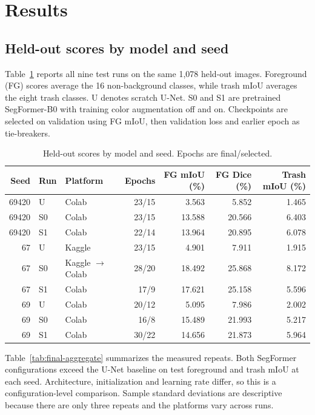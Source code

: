 \section{Results}
\subsection{Held-out scores by model and seed}
Table~\ref{tab:final-seed-results} reports all nine test runs on the same 1,078 held-out images. Foreground (FG) scores average the 16 non-background classes, while trash mIoU averages the eight trash classes. U denotes scratch U-Net. S0 and S1 are pretrained SegFormer-B0 with training color augmentation off and on. Checkpoints are selected on validation using FG mIoU, then validation loss and earlier epoch as tie-breakers.

\begin{table}[H]\centering\small
\caption{Held-out scores by model and seed. Epochs are final/selected.}\label{tab:final-seed-results}
\begin{tabular}{@{}rllrrrr@{}}\toprule
Seed & Run & Platform & Epochs & FG mIoU (\%) & FG Dice (\%) & Trash mIoU (\%) \\\midrule
69420 & U & Colab & 23/15 & 3.563 & 5.852 & 1.465 \\
69420 & S0 & Colab & 23/15 & 13.588 & 20.566 & 6.403 \\
69420 & S1 & Colab & 22/14 & 13.964 & 20.895 & 6.078 \\
67 & U & Kaggle & 23/15 & 4.901 & 7.911 & 1.915 \\
67 & S0 & Kaggle $\to$ Colab & 28/20 & 18.492 & 25.868 & 8.172 \\
67 & S1 & Colab & 17/9 & 17.621 & 25.158 & 5.596 \\
69 & U & Colab & 20/12 & 5.095 & 7.986 & 2.002 \\
69 & S0 & Colab & 16/8 & 15.489 & 21.993 & 5.217 \\
69 & S1 & Colab & 30/22 & 14.656 & 21.873 & 5.964 \\
\bottomrule
\end{tabular}
\end{table}

Table~\ref{tab:final-aggregate} summarizes the measured repeats. Both SegFormer configurations exceed the U-Net baseline on test foreground and trash mIoU at each seed. Architecture, initialization and learning rate differ, so this is a configuration-level comparison. Sample standard deviations are descriptive because there are only three repeats and the platforms vary across runs.

